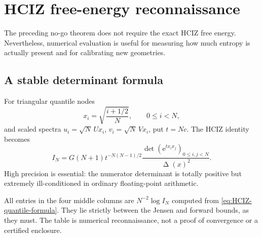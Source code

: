 \documentclass[11pt]{article}
\newcommand{\DeltaV}{\mathop{\Delta}\nolimits}
\newcommand{\e}{\mathrm e}
\newcommand{\1}{\mathbf 1}
\theoremstyle{plain}
\theoremstyle{definition}
\theoremstyle{remark}
\begin{document}
\section{HCIZ free-energy reconnaissance}
\label{sec:hciz-numerics}

The preceding no-go theorem does not require the exact HCIZ free energy.
Nevertheless, numerical evaluation is useful for measuring how much entropy
is actually present and for calibrating new geometries.

\subsection{A stable determinant formula}

For triangular quantile nodes
\[
 x_i=\sqrt{\frac{i+1/2}{N}},\qquad 0\le i<N,
\]
and scaled spectra $u_i=\sqrt N\,U x_i$,
$v_i=\sqrt N\,V x_i$, put $t=Nc$.  The HCIZ identity becomes
\begin{equation}\label{eq:HCIZ-quantile-formula}
 I_N=G(N+1)t^{-N(N-1)/2}
 \frac{\det(\e^{t x_i x_j})_{0\le i,j<N}}{\DeltaV(x)^2}.
\end{equation}
High precision is essential: the numerator determinant is totally positive
but extremely ill-conditioned in ordinary floating-point arithmetic.

\begin{center}
\end{center}
All entries in the four middle columns are $N^{-2}\log I_N$ computed from
\eqref{eq:HCIZ-quantile-formula}.  They lie strictly between the Jensen and
forward bounds, as they must.  The table is numerical reconnaissance, not a
proof of convergence or a certified enclosure.
\end{document}
